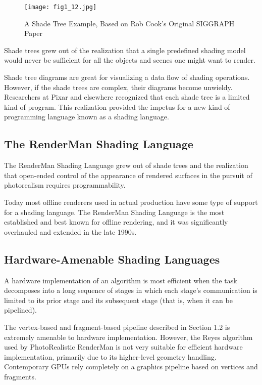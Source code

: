 \documentclass[../main.tex]{subfiles}
\begin{document}
\begin{figure}
    \centering
    \texttt{[image: fig1\_12.jpg]}
    \caption{A Shade Tree Example, Based on Rob Cook's Original SIGGRAPH Paper}
    \label{fig:1-12}
\end{figure}

Shade trees grew out of the realization that a single predefined shading model would never be sufficient for all the objects and scenes one might want to render.

Shade tree diagrams are great for visualizing a data flow of shading operations. However, if the shade trees are complex, their diagrams become unwieldy. Researchers at Pixar and elsewhere recognized that each shade tree is a limited kind of program. This realization provided the impetus for a new kind of programming language known as a shading language.

\subsection*{The RenderMan Shading Language}

The RenderMan Shading Language grew out of shade trees and the realization that open-ended control of the appearance of rendered surfaces in the pursuit of photorealism requires programmability.

Today most offline renderers used in actual production have some type of support for a shading language. The RenderMan Shading Language is the most established and best known for offline rendering, and it was significantly overhauled and extended in the late 1990s.

\subsection*{Hardware-Amenable Shading Languages}

A hardware implementation of an algorithm is most efficient when the task decomposes into a long sequence of stages in which each stage's communication is limited to its prior stage and its subsequent stage (that is, when it can be pipelined).

The vertex-based and fragment-based pipeline described in Section 1.2 is extremely amenable to hardware implementation. However, the Reyes algorithm used by PhotoRealistic RenderMan is not very suitable for efficient hardware implementation, primarily due to its higher-level geometry handling. Contemporary GPUs rely completely on a graphics pipeline based on vertices and fragments.
\end{document}
